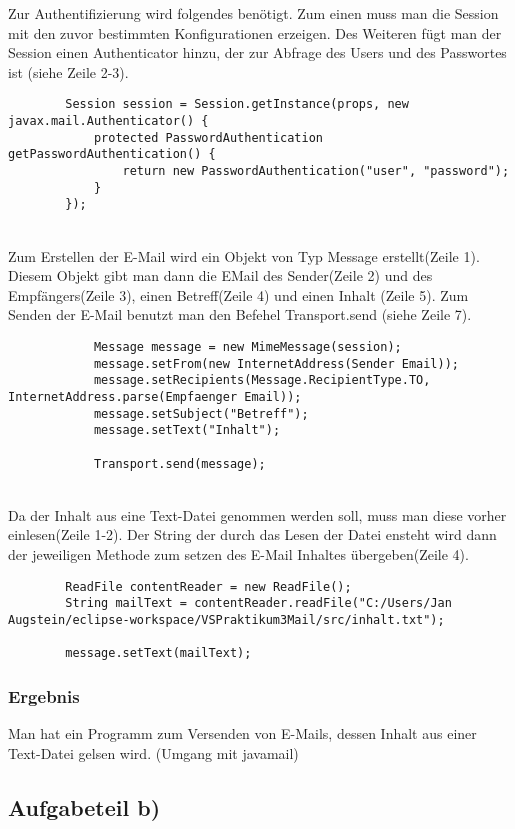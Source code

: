 Zur Authentifizierung wird folgendes benötigt. Zum einen muss man die Session mit den zuvor bestimmten Konfigurationen erzeigen. Des Weiteren fügt man der Session einen Authenticator hinzu, der zur Abfrage des Users und des Passwortes ist (siehe Zeile 2-3).
\begin{lstlisting}
		Session session = Session.getInstance(props, new javax.mail.Authenticator() {
			protected PasswordAuthentication getPasswordAuthentication() {
				return new PasswordAuthentication("user", "password");
			}
		});
\end{lstlisting}
\\

Zum Erstellen der E-Mail wird ein Objekt von Typ Message erstellt(Zeile 1). Diesem Objekt gibt man dann die EMail des Sender(Zeile 2) und des Empfängers(Zeile 3), einen Betreff(Zeile 4) und einen Inhalt (Zeile 5). Zum Senden der E-Mail benutzt man den Befehel Transport.send (siehe Zeile 7).
\begin{lstlisting}
			Message message = new MimeMessage(session);
			message.setFrom(new InternetAddress(Sender Email));
			message.setRecipients(Message.RecipientType.TO, InternetAddress.parse(Empfaenger Email));
			message.setSubject("Betreff");
			message.setText("Inhalt");
			
			Transport.send(message);
\end{lstlisting}
\\

Da der Inhalt aus eine Text-Datei genommen werden soll, muss man diese vorher einlesen(Zeile 1-2). Der String der durch das Lesen der Datei ensteht wird dann der jeweiligen Methode zum setzen des E-Mail Inhaltes übergeben(Zeile 4).
\begin{lstlisting}
		ReadFile contentReader = new ReadFile();
		String mailText = contentReader.readFile("C:/Users/Jan Augstein/eclipse-workspace/VSPraktikum3Mail/src/inhalt.txt");
		
		message.setText(mailText);
\end{lstlisting}

\subsubsection{Ergebnis}
Man hat ein Programm zum Versenden von E-Mails, dessen Inhalt aus einer Text-Datei gelsen wird. (Umgang mit javamail)

\subsection{Aufgabeteil b)}
